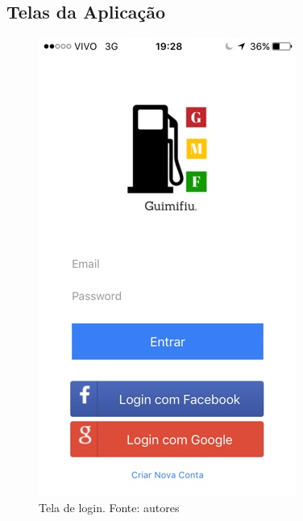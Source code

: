 \begin{anexosenv}

\partanexos

\chapter{Telas da Aplicação}
\label{chap:telas}

\begin{figure}[H]
    \centering
    \includegraphics[scale=0.5]{figuras/app_1.jpg}
    \caption[Tela de login]{Tela de login. Fonte: autores}
    \label{img:tela_de_login}
\end{figure}


\end{anexosenv}
